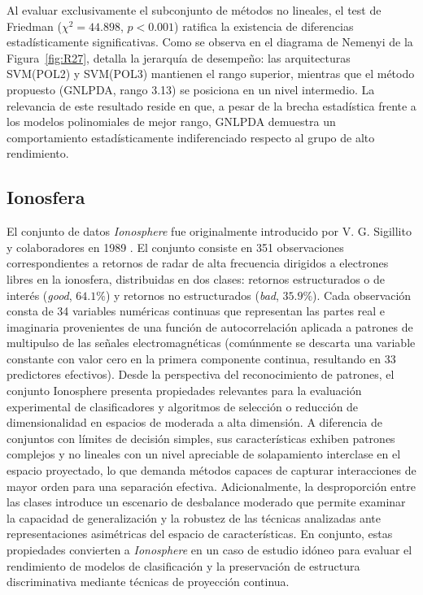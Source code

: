 Al evaluar exclusivamente el subconjunto de métodos no lineales, el test de Friedman ($\chi^2= 44.898$, $p<0.001$) ratifica la existencia de diferencias estadísticamente significativas. Como se observa en el diagrama de Nemenyi de la Figura~\ref{fig:R27}, detalla la jerarquía de desempeño: las arquitecturas SVM(POL2) y SVM(POL3) mantienen el rango superior, mientras que el método propuesto (GNLPDA, rango 3.13) se posiciona en un nivel intermedio. La relevancia de este resultado reside en que, a pesar de la brecha estadística frente a los modelos polinomiales de mejor rango, GNLPDA demuestra un comportamiento estadísticamente indiferenciado respecto al grupo de alto rendimiento.


\subsection{Ionosfera}

El conjunto de datos \textit{Ionosphere} fue originalmente introducido por V. G. Sigillito y colaboradores en 1989 \cite{sigillito1989classification}. El conjunto consiste en 351 observaciones correspondientes a retornos de radar de alta frecuencia dirigidos a electrones libres en la ionosfera, distribuidas en dos clases: retornos estructurados o de interés (\textit{good}, $64.1\%$) y retornos no estructurados (\textit{bad}, $35.9\%$). Cada observación consta de 34 variables numéricas continuas que representan las partes real e imaginaria provenientes de una función de autocorrelación aplicada a patrones de multipulso de las señales electromagnéticas (comúnmente se descarta una variable constante con valor cero en la primera componente continua, resultando en 33 predictores efectivos).  Desde la perspectiva del reconocimiento de patrones, el conjunto Ionosphere presenta propiedades relevantes para la evaluación experimental de clasificadores y algoritmos de selección o reducción de dimensionalidad en espacios de moderada a alta dimensión. A diferencia de conjuntos con límites de decisión simples, sus características exhiben patrones complejos y no lineales con un nivel apreciable de solapamiento interclase en el espacio proyectado, lo que demanda métodos capaces de capturar interacciones de mayor orden para una separación efectiva. Adicionalmente, la desproporción entre las clases introduce un escenario de desbalance moderado que permite examinar la capacidad de generalización y la robustez de las técnicas analizadas ante representaciones asimétricas del espacio de características. En conjunto, estas propiedades convierten a \textit{Ionosphere} en un caso de estudio idóneo para evaluar el rendimiento de modelos de clasificación y la preservación de estructura discriminativa mediante técnicas de proyección continua.


